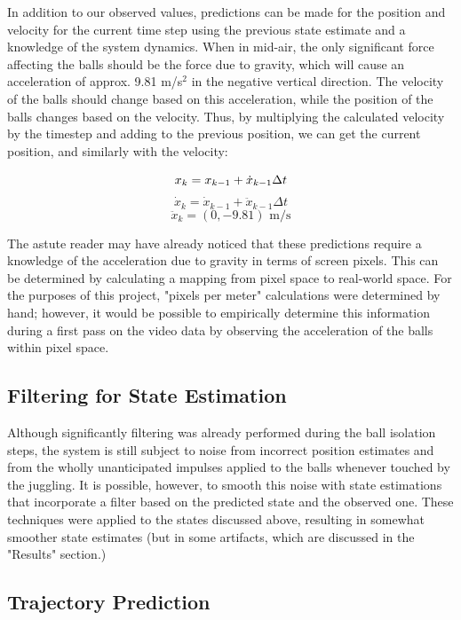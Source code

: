 \documentclass[letterpaper, 10 pt, conference]{ieeeconf}  %
\begin{document}
In addition to our observed values, predictions can be made for the position and velocity for the current time step using the previous state estimate and a knowledge of the system dynamics. When in mid-air, the only significant force affecting the balls should be the force due to gravity, which will cause an acceleration of approx. 9.81 m/s$^{2}$ in the negative vertical direction. The velocity of the balls should change based on this acceleration, while the position of the balls changes based on the velocity. Thus, by multiplying the calculated velocity by the timestep and adding to the previous position, we can get the current position, and similarly with the velocity:

\[
x_{k} = x_{k-1} + \dot{x}_{k-1} \Delta t \\ \\
\]
\[
\dot{x}_{k} = \dot{x}_{k-1} + \ddot{x}_{k-1} \Delta t
\]
\[
\ddot{x}_{k} = (0, -9.81) \text{ m/s}
\]

The astute reader may have already noticed that these predictions require a knowledge of the acceleration due to gravity in terms of screen pixels. This can be determined by calculating a mapping from pixel space to real-world space. For the purposes of this project, "pixels per meter" calculations were determined by hand; however, it would be possible to empirically determine this information during a first pass on the video data by observing the acceleration of the balls within pixel space.

\subsection{Filtering for State Estimation}

Although significantly filtering was already performed during the ball isolation steps, the system is still subject to noise from incorrect position estimates and from the wholly unanticipated impulses applied to the balls whenever touched by the juggling. It is possible, however, to smooth this noise with state estimations that incorporate a filter based on the predicted state and the observed one. These techniques were applied to the states discussed above, resulting in somewhat smoother state estimates (but in some artifacts, which are discussed in the "Results" section.)

\subsection{Trajectory Prediction}
\end{document}
